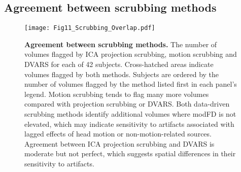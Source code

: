 \documentclass{article}
\begin{document}
\subsection{Agreement between scrubbing methods}

\begin{figure}
    \centering
    \texttt{[image: Fig11\_Scrubbing\_Overlap.pdf]}
    \caption{\small \textbf{Agreement between scrubbing methods.} The number of volumes flagged by ICA projection scrubbing, motion scrubbing and DVARS for each of 42 subjects. Cross-hatched areas indicate volumes flagged by both methods. Subjects are ordered by the number of volumes flagged by the method listed first in each panel's legend. Motion scrubbing tends to flag many more volumes compared with projection scrubbing or DVARS. Both data-driven scrubbing methods identify additional volumes where modFD is not elevated, which may indicate sensitivity to artifacts associated with lagged effects of head motion or non-motion-related sources. Agreement between ICA projection scrubbing and DVARS is moderate but not perfect, which suggests spatial differences in their sensitivity to artifacts.}
    \label{fig:overlaps}
\end{figure}
\end{document}
